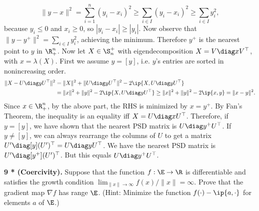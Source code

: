 \documentclass[../borwein-lewis_notes.tex]{subfiles}
\begin{document}
\begin{enumerate}[(a)]
{\begin{equation*}
\|y-x\|^2 = \sum_{i=1}^n (y_i-x_i)^2 \geq \sum_{i\in I} (y_i-x_i)^2 
\geq \sum_{i\in I} y_i^2,
\end{equation*}
because $y_i\leq 0$ and $x_i\geq 0$, so $|y_i-x_i| \geq |y_i|$. 
Now observe that $\|y-y^+\|^2 = \sum_{i\in I} y_i^2$, achieving the 
minimum. Therefore $y^+$ is the nearest point to $y$ in $\R_+^n$.
Now let $X\in\S^+_n$ with eigendecomposition $X=V\diag x V^\top$, 
with $x = \lambda(X)$. First we assume $y=[y]$, i.e. $y$'s entries 
are sorted in nonincreasing order.
\begin{align*}
\|X-U\diag y U^\top\|^2 &= \|X\|^2 + \|U\diag y U^\top\|^2 - 2\ip{X,
U\diag y U^\top} \\
&= \|x\|^2 + \|y\|^2 - 2\ip{X, U\diag y U^\top}
\geq \|x\|^2 + \|y\|^2 -2\ip{x,y} = \|x-y\|^2.
\end{align*}
Since $x\in\R_+^n$, by the above part, the RHS is minimized by 
$x=y^+$. By Fan's Theorem, the inequality is an equality iff 
$X = U\diag x U^\top$. Therefore, if $y=[y]$, we have shown 
that the nearest PSD matrix is $U\diag y^+ U^\top$. If $y\neq [y]$, 
we can always rearrange the columns of $U$ to get a matrix $U'\diag[y]
(U')^\top= U\diag y U^\top$. We have the nearest PSD matrix is 
$U'\diag[y^+] (U')^{\top}$. But this equals $U\diag y^+ U^\top$.
}
\end{enumerate}
\noindent\textbf{9 * (Coercivity).} Suppose that the function $f:\E\to\R$ 
is differentiable and satisfies the growth condition $\lim_{\|x\|\to\infty}
f(x)/\|x\|=\infty$. Prove that the gradient map $\nabla f$ has range 
$\E$. (Hint: Minimize the function $f(\cdot)-\ip{a,\cdot}$ for elements 
$a$ of $\E$.)
\end{document}
